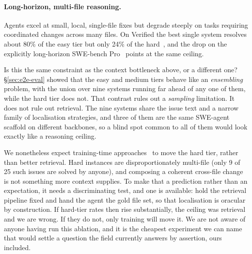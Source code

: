 \documentclass[
  english,        %
  font=times,     %
  twocolumn,      %
]{tumarticle}
\begin{document}
\paragraph{Long-horizon, multi-file reasoning.}
Agents excel at small, local, single-file fixes but degrade steeply on tasks
requiring coordinated changes across many files. On Verified the best single
system resolves about 80\% of the easy tier but only 24\% of the
hard~\cite{ganhotra2025difficulty}, and the drop on the explicitly long-horizon
SWE-bench Pro~\cite{deng2025swebenchpro} points at the same ceiling.

Is this the same constraint as the context bottleneck above, or a different one?
\S\ref{sec:e2e-eval} showed that the easy and medium tiers behave like an
\emph{ensembling} problem, with the union over nine systems running far ahead of
any one of them, while the hard tier does not. That contrast rules out a
\emph{sampling} limitation. It does not rule out retrieval. The nine systems share
the issue text and a narrow family of localisation strategies, and three of them
are the same SWE-agent scaffold on different backbones, so a blind spot common to
all of them would look exactly like a reasoning ceiling.

We nonetheless expect training-time approaches~\cite{wei2025swerl,pan2024swegym}
to move the hard tier, rather than better retrieval. Hard instances are
disproportionately multi-file (only 9 of 25 such issues are solved by anyone), and
composing a coherent cross-file change is not something more context supplies. To
make that a prediction rather than an expectation, it needs a discriminating test,
and one is available: hold the retrieval pipeline fixed and hand the agent the
gold file set, so that localisation is oracular by construction. If hard-tier
rates then rise substantially, the ceiling was retrieval and we are wrong. If they
do not, only training will move it. We are not aware of anyone having run this
ablation, and it is the cheapest experiment we can name that would settle a
question the field currently answers by assertion, ours included.
\end{document}
